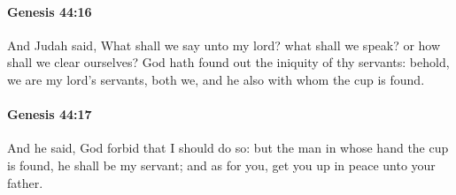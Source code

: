 		\paragraph{Genesis 44:16} %
			\label{GENESIS-44-16}

			And Judah said, What shall we say unto my lord? what shall we speak? or how shall we clear ourselves? God hath found out the iniquity of thy servants: behold, we are my lord's servants, both we, and he also with whom the cup is found.


		\paragraph{Genesis 44:17} %
			\label{GENESIS-44-17}

			And he said, God forbid that I should do so: but the man in whose hand the cup is found, he shall be my servant; and as for you, get you up in peace unto your father.


